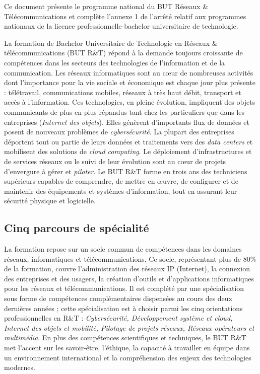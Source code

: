 Ce document présente le programme national du BUT Réseaux \& Télécommunications et complète l'annexe 1 de l’arrêté relatif aux programmes nationaux de la licence professionnelle-bachelor universitaire de technologie.

\bigskip

La formation de Bachelor Universitaire de Technologie en Réseaux \& télécommunications  (BUT R\&T) répond à la demande toujours croissante de compétences dans les secteurs  des technologies de l'information et de la communication. Les réseaux informatiques sont au cœur de nombreuses activités dont l'importance pour la vie sociale et économique est chaque jour plus présente : télétravail, communications mobiles, réseaux à très haut débit, transport et accès à l'information. Ces technologies, en pleine évolution, impliquent des objets communicants  de plus en plus répandus tant chez les particuliers que dans les entreprises ({\em Internet des objets}). Elles génèrent d'importants flux de données et posent de nouveaux problèmes de {\em cybersécurité}. La plupart des entreprises déportent tout ou partie de leurs données et traitements vers des {\em data centers} et mobilisent des solutions de {\em cloud computing}. Le déploiement d'infrastructures et de services réseaux ou le suivi de leur évolution sont au cœur de projets d'envergure à gérer et {\em piloter}.  Le BUT R\&T forme en trois ans des techniciens supérieurs capables de comprendre, de mettre en œuvre, de  configurer et de maintenir des équipements et systèmes d'information, tout en assurant leur sécurité physique et logicielle. 

\subsection*{Cinq parcours de spécialité}
La formation repose sur un socle commun de compétences dans les domaines réseaux, informatiques et télécommunications. Ce socle, représentant plus de 80\% de la formation, couvre l'administration des réseaux IP (Internet), la connexion des entreprises et des usagers, la création d'outils et d'applications informatiques pour les réseaux et télécommunications. Il est complété par une spécialisation sous forme de compétences complémentaires dispensées au cours des deux dernières années ; cette spécialisation est à choisir parmi les cinq orientations professionnelles en R\&T : {\em Cybersécurité, Développement système et cloud, Internet des objets et mobilité, Pilotage de projets réseaux, Réseaux opérateurs et multimédia}. En plus des compétences scientifiques et techniques, le BUT R\&T met l'accent sur les savoir-être, l'éthique, la capacité à travailler en équipe dans un environnement international et la compréhension des enjeux des technologies modernes.

